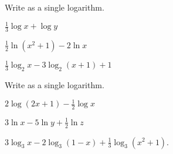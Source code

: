 \vfill
\begin{center} \hfill
\end{center}

\begin{exercise}
	Write as a single logarithm.\\
	\noindent
	\begin{enumerate*}[label={(\arabic*)~}]
		\item $\frac13\log x +\log y$
		\item $\frac12\ln(x^2+1)-2\ln x$
		\item $\frac13\log_2 x - 3\log_2(x+1)+1$
	\end{enumerate*}
\end{exercise}

\vfill
\begin{center} \hfill
\end{center}

\newpage
\begin{exercise}
	Write as a single logarithm.\\
	\noindent
	\begin{enumerate*}[label={(\arabic*)~}]
		\item $2\log(2x+1)-\frac12\log x$
		\item $3\ln x - 5\ln y + \frac{1}{2}\ln z$
		\item $3\log_3 x-2\log_3(1-x)+\frac13\log_3 (x^2+1)$.
	\end{enumerate*}
\end{exercise}

